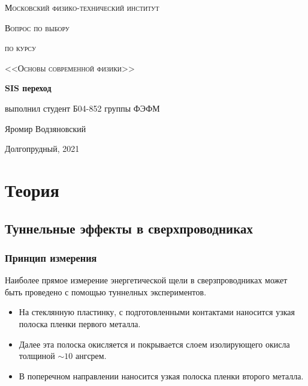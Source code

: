 \documentclass[a4paper]{article}
\begin{document}
\graphicspath{ {pictures/} }

\begin{titlepage}
	\centering
	\vspace{5cm}
    {\scshape\LARGE Московский физико-технический институт\par}
	\vspace{5cm}
	{\scshape\Large Вопрос по выбору \par}
    {\scshape\Large по курсу \par}
    {\scshape\Large <<Основы современной физики>> \par}
	\vspace{1cm}
    {\huge\bfseries  SIS переход \par}
	\vspace{1cm}
	\vfill
    \begin{flushright}
        {\large выполнил студент Б04-852 группы ФЭФМ}\par
        \vspace{0.3cm}
        {\LARGE Яромир Водзяновский}
    \end{flushright}
	\vfill
Долгопрудный, 2021
\end{titlepage}

\pagestyle{fancy} 
\fancyfoot[C]{ \noindent\rule{\textwidth}{0.4pt} \thepage }



\newpage

\section{Теория}

\subsection{Туннельные эффекты в сверхпроводниках}

\subsubsection{Принцип измерения}

Наиболее прямое измерение энергетической щели в сверзпроводниках может быть проведено с помощью туннелных экспериментов. \par 
\begin{itemize}
    \item На стеклянную пластинку, с подготовленными контактами наносится узкая полоска пленки первого металла.
    \item Далее эта полоска окисляется и покрывается слоем изолирующего окисла толщиной $\sim 10 $ ангсрем. 
    \item В поперечном направлении наносится узкая полоска пленки второго металла.
\end{itemize}
\end{document}
